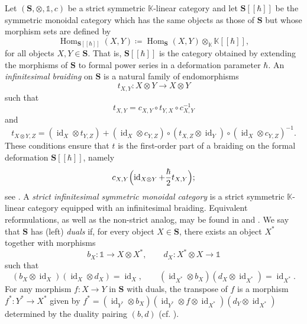 \documentclass{amsart}
\newcommand{\bS}{\mathbf{S}}
\newcommand{\kk}{\mathbb{K}}    %
\newcommand{\id}{\operatorname{id}}
\newcommand{\Hom}{\operatorname{Hom}}
\newcommand{\lrar}{\ensuremath{\longrightarrow}}
\theoremstyle{definition}
\numberwithin{equation}{section}
\begin{document}


Let $(\bS,\otimes,\mathbb{1},c)$ be a strict symmetric $\kk$-linear category and let $\bS[[\hbar]]$ be the symmetric monoidal category which has the same objects as those of $\bS$ but whose morphism sets are defined by \[ \Hom_{\bS[[\hbar]]}(X,Y) \coloneqq \Hom_{\bS}(X,Y) \otimes_{\kk} \kk[[\hbar]], \] for all objects $X, Y \in \bS$. That is, $\bS[[\hbar]]$ is the category obtained by extending the morphisms of $\bS$ to formal power series in a deformation parameter $\hbar$. An \emph{infinitesimal braiding} on $\bS$ is a natural family of endomorphisms
\[
t_{X,Y}\colon X\otimes Y\to X\otimes Y
\]
such that
\[
t_{X,Y}=c_{X,Y}\circ t_{Y,X}\circ c_{X,Y}^{-1}
\]
and
\[
t_{X\otimes Y,Z}
=
(\id_X\otimes t_{Y,Z})
+
(\id_X\otimes c_{Y,Z})\circ (t_{X,Z}\otimes \id_Y)\circ (\id_X\otimes c_{Y,Z})^{-1}.
\]
These conditions ensure that $t$ is the first-order part of a braiding on the formal deformation $\bS[[\hbar]]$, namely
\[
c_{X,Y}\Bigl(\id_{X\otimes Y}+\frac{\hbar}{2}t_{X,Y}\Bigr);
\]
see \cite{Cartier1992Vessiliev_Invarients}. A \emph{strict infinitesimal symmetric monoidal category} is a strict symmetric $\kk$-linear category equipped with an infinitesimal braiding. Equivalent reformulations, as well as the non-strict analog, may be found in \cite[Proposition.~B.1]{KT_Tangles} and \cite[Section~10.3.3]{FresseBook1}. We say that $\bS$ has (left) \emph{duals} if, for every object $X \in \bS$, there exists an object $X^*$ together with morphisms
\[
b_X : \mathbb{1} \to X \otimes X^*, \qquad d_X : X^* \otimes X \to \mathbb{1}
\]
such that
\begin{equation}\label{eq: left dual zig zag equations}
(b_X \otimes \id_X) (\id_X \otimes d_X)  = \id_X, \qquad (\id_{X^*} \otimes b_X) (d_X \otimes \id_{X^*})  = \id_{X^*}.
\end{equation}
For any morphism $f: X \lrar Y$ in $\bS$ with duals, the transpose of $f$ is a morphism $f^*: Y^* \lrar X^*$ given by $f^* = (\id_{Y^*}\otimes b_X)(\id_{Y^*}\otimes f\otimes\id_{X^*}) (d_Y\otimes\id_{X^*})$ determined by the duality pairing $(b,d)$ (cf. \cite[Chapter XIV.2]{kassel_quantum_1995}). 
\end{document}
